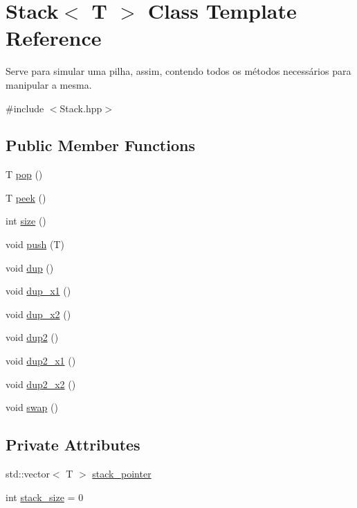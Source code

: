 \hypertarget{class_stack}{}\section{Stack$<$ T $>$ Class Template Reference}
\label{class_stack}


Serve para simular uma pilha, assim, contendo todos os métodos necessários para manipular a mesma.  




{\ttfamily \#include $<$Stack.\+hpp$>$}

\subsection*{Public Member Functions}
\begin{DoxyCompactItemize}
\item 
T \hyperlink{class_stack_aa2ea0e8c3293648589dd734d52487408}{pop} ()
\item 
T \hyperlink{class_stack_adcb4774ac8aa94cbc19b461da9bdee3a}{peek} ()
\item 
int \hyperlink{class_stack_a3091d98f798b1b3e69b644d5b778c428}{size} ()
\item 
void \hyperlink{class_stack_a23b04908bc297e161d12aa75f5382bfd}{push} (T)
\item 
void \hyperlink{class_stack_ac7e3d5061c78ef7ef18204fcff2ea961}{dup} ()
\item 
void \hyperlink{class_stack_a17bf398ef75558bbaa53d9f10cab3f6d}{dup\+\_\+x1} ()
\item 
void \hyperlink{class_stack_a3fd6d36a125d1866e41962305c307938}{dup\+\_\+x2} ()
\item 
void \hyperlink{class_stack_a051356c2f703dace36ae20f6f699145d}{dup2} ()
\item 
void \hyperlink{class_stack_a2fb716733b0a6bae2a5e5a374308825f}{dup2\+\_\+x1} ()
\item 
void \hyperlink{class_stack_afe973ebe6ec78d113009906ffa30219a}{dup2\+\_\+x2} ()
\item 
void \hyperlink{class_stack_aa308582129c6dc872950b08a82eceea3}{swap} ()
\end{DoxyCompactItemize}
\subsection*{Private Attributes}
\begin{DoxyCompactItemize}
\item 
std\+::vector$<$ T $>$ \hyperlink{class_stack_a7ff6ea8386d10575c66af5461360f679}{stack\+\_\+pointer}
\item 
int \hyperlink{class_stack_a1a9e981b54a1f437580c5fccdbaae1fa}{stack\+\_\+size} = 0
\end{DoxyCompactItemize}


